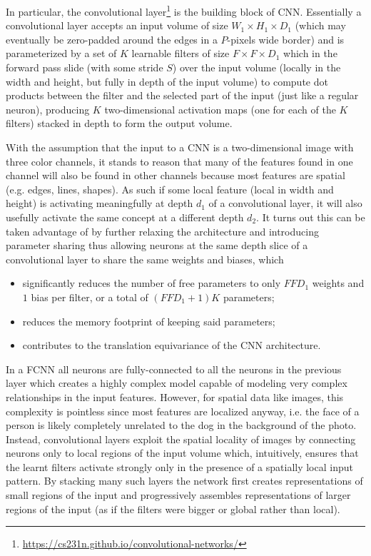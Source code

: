 In particular, the convolutional layer\footnote{\url{https://cs231n.github.io/convolutional-networks/}} is the building block of \ac{CNN}. Essentially a convolutional layer accepts an input volume of size $W_1 \times H_1 \times D_1$ (which may eventually be zero-padded around the edges in a $P$-pixels wide border) and is parameterized by a set of $K$ learnable filters of size $F \times F \times D_1$ which in the forward pass slide (with some stride $S$) over the input volume (locally in the width and height, but fully in depth of the input volume) to compute dot products between the filter and the selected part of the input (just like a regular neuron), producing $K$ two-dimensional activation maps (one for each of the $K$ filters) stacked in depth to form the output volume.

With the assumption that the input to a \ac{CNN} is a two-dimensional image with three color channels, it stands to reason that many of the features found in one channel will also be found in other channels because most features are spatial (e.g. edges, lines, shapes). As such if some local feature (local in width and height) is activating meaningfully at depth $d_1$ of a convolutional layer, it will also usefully activate the same concept at a different depth $d_2$. It turns out this can be taken advantage of by further relaxing the architecture and introducing parameter sharing thus allowing neurons at the same depth slice of a convolutional layer to share the same weights and biases, which

\begin{itemize}
    \item significantly reduces the number of free parameters to only $F F D_1$ weights and $1$ bias per filter, or a total of $(F F D_1 + 1) K$ parameters;
    \item reduces the memory footprint of keeping said parameters;
    \item contributes to the translation equivariance of the \ac{CNN} architecture.
\end{itemize}

In a \ac{FCNN} all neurons are fully-connected to all the neurons in the previous layer which creates a highly complex model capable of modeling very complex relationships in the input features. However, for spatial data like images, this complexity is pointless since most features are localized anyway, i.e. the face of a person is likely completely unrelated to the dog in the background of the photo. Instead, convolutional layers exploit the spatial locality of images by connecting neurons only to local regions of the input volume which, intuitively, ensures that the learnt filters activate strongly only in the presence of a spatially local input pattern. By stacking many such layers the network first creates representations of small regions of the input and progressively assembles representations of larger regions of the input (as if the filters were bigger or global rather than local).

